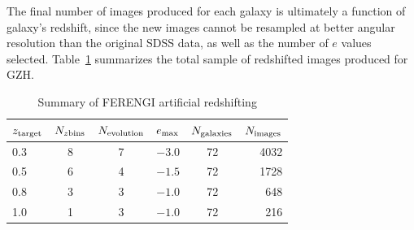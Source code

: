 \documentclass[usenatbib]{mn2e}
\begin{document}
The final number of \ferengi{} images produced for each galaxy is ultimately a function of galaxy's redshift, since the new images cannot be resampled at better angular resolution than the original SDSS data, as well as the number of $e$ values selected. Table~\ref{tbl:ferengivalues} summarizes the total sample of redshifted images produced for GZH. 

\begin{table}
\caption{Summary of FERENGI artificial redshifting \label{tbl:ferengivalues}}
\begin{tabular}{lccccr}
\hline\hline
$z_{\rm target}$ & $N_{z {\rm bins}}$ & $N_{\rm evolution}$ & $e_{\rm max}$ & $N_{\rm galaxies}$ & $N_{\rm images}$\\
\hline
0.3              & 8                  & 7                   & $-3.0$        & 72             & 4032 \\
0.5              & 6                  & 4                   & $-1.5$        & 72             & 1728 \\
0.8              & 3                  & 3                   & $-1.0$        & 72             &  648 \\
1.0              & 1                  & 3                   & $-1.0$        & 72             &  216 \\
\hline\hline
\end{tabular}
\end{table}
\end{document}
